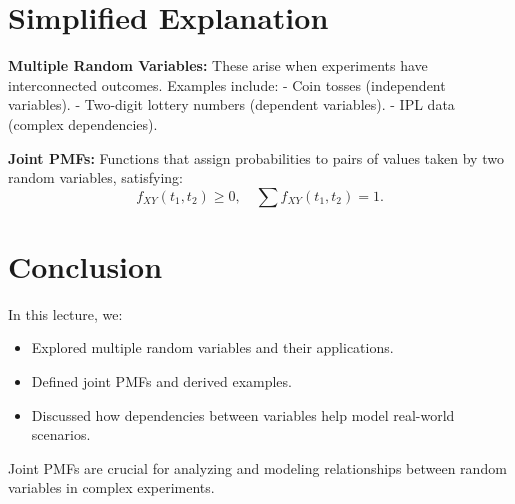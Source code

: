 \documentclass{article}
\begin{document}
\section*{Simplified Explanation}

\textbf{Multiple Random Variables:}
These arise when experiments have interconnected outcomes. Examples include:
- Coin tosses (independent variables).
- Two-digit lottery numbers (dependent variables).
- IPL data (complex dependencies).

\textbf{Joint PMFs:}
Functions that assign probabilities to pairs of values taken by two random variables, satisfying:
\[
  f_{XY}(t_1, t_2) \geq 0, \quad \sum f_{XY}(t_1, t_2) = 1.
\]

\section*{Conclusion}

In this lecture, we:
\begin{itemize}
  \item Explored multiple random variables and their applications.
  \item Defined joint PMFs and derived examples.
  \item Discussed how dependencies between variables help model real-world scenarios.
\end{itemize}

Joint PMFs are crucial for analyzing and modeling relationships between random variables in complex experiments.
\end{document}
